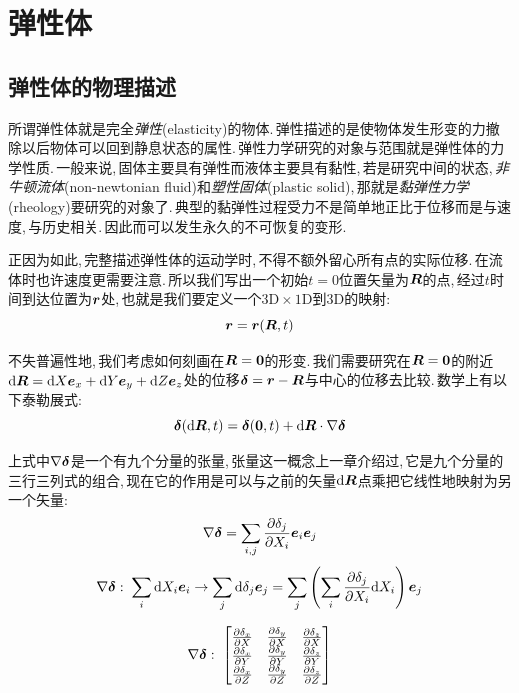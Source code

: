 \chapter{弹性体}


\section{弹性体的物理描述}

所谓弹性体就是完全\emph{弹性}(elasticity)的物体.\,弹性描述的是使物体发生形变的力撤除以后物体可以回到静息状态的属性.\,弹性力学研究的对象与范围就是弹性体的力学性质.\,一般来说,\,固体主要具有弹性而液体主要具有黏性,\,若是研究中间的状态,\,\emph{非牛顿流体}(non-newtonian fluid)和\emph{塑性固体}(plastic solid),\,那就是\emph{黏弹性力学}(rheology)要研究的对象了.\,典型的黏弹性过程受力不是简单地正比于位移而是与速度,\,与历史相关.\,因此而可以发生永久的不可恢复的变形.

正因为如此,\,完整描述弹性体的运动学时,\,不得不额外留心所有点的实际位移.\,在流体时也许速度更需要注意.\,所以我们写出一个初始$t=0$位置矢量为$\boldsymbol{R}$的点,\,经过$t$时间到达位置为$\boldsymbol{r}$处,\,也就是我们要定义一个$\mathrm{3D}\times\mathrm{1D}$到$\mathrm{3D}$的映射:
\[\boldsymbol{r}=\boldsymbol{r}(\boldsymbol{R},t)\]

不失普遍性地,\,我们考虑如何刻画在$\boldsymbol{R}=\boldsymbol{0}$的形变.\,我们需要研究在$\boldsymbol{R}=\boldsymbol{0}$的附近$\textrm{d} \boldsymbol{R}=\textrm{d} X\boldsymbol{e}_x+\textrm{d} Y\boldsymbol{e}_y+\textrm{d} Z\boldsymbol{e}_z$处的位移$\boldsymbol{\delta}=\boldsymbol{r}-\boldsymbol{R}$与中心的位移去比较.\,数学上有以下泰勒展式:
\[\boldsymbol{\delta}(\textrm{d} \boldsymbol{R},t)=\boldsymbol{\delta}(\boldsymbol{0},t)+\textrm{d} \boldsymbol{R}\cdot \nabla \boldsymbol{\delta}\]

上式中$\nabla\boldsymbol{\delta}$是一个有九个分量的张量,\,张量这一概念上一章介绍过,\,它是九个分量的三行三列式的组合,\,现在它的作用是可以与之前的矢量$\textrm{d} \boldsymbol{R}$点乘把它线性地映射为另一个矢量:
\[\nabla\boldsymbol{\delta}=\sum_{i,j}\frac{\partial \delta_j}{\partial X_i}\boldsymbol{e}_i\boldsymbol{e}_j\]
\[\nabla\boldsymbol{\delta}:\; \sum_i\textrm{d} X_i\boldsymbol{e}_i\rightarrow \sum_j\textrm{d} \delta_j\boldsymbol{e}_j=\sum_j\left(\sum_i \frac{\partial \delta_j}{\partial X_i}\textrm{d} X_i\right)\boldsymbol{e}_j\]

\[\nabla\boldsymbol{\delta}:\; \begin{bmatrix}\frac{\partial \delta_x}{\partial X}&\frac{\partial \delta_y}{\partial X}&\frac{\partial \delta_z}{\partial X}\\\frac{\partial \delta_x}{\partial Y}&\frac{\partial \delta_y}{\partial Y}&\frac{\partial \delta_z}{\partial Y}\\\frac{\partial \delta_x}{\partial Z}&\frac{\partial \delta_y}{\partial Z}&\frac{\partial \delta_z}{\partial Z}\end{bmatrix}\]


